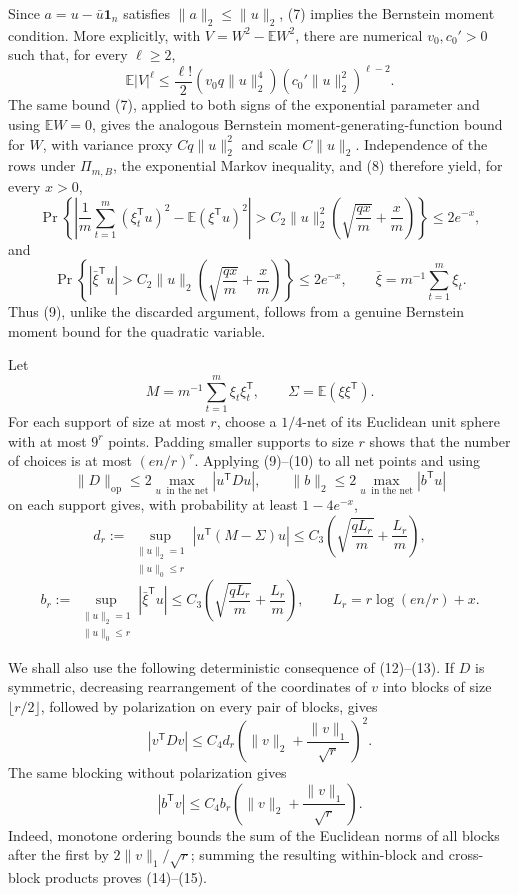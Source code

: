 Since \(a=u-\bar u\mathbf 1_n\) satisfies \(\lVert a\rVert_2\le\lVert u\rVert_2\), (7) implies the Bernstein moment condition.  More explicitly, with \(V=W^2-\mathbb EW^2\), there are numerical \(v_0,c_0'>0\) such that, for every \(\ell\ge2\),
\[
 \mathbb E|V|^\ell
 \le \frac{\ell!}{2}(v_0q\lVert u\rVert_2^4)
       (c_0'\lVert u\rVert_2^2)^{\ell-2}.
 \tag{8}
\]
The same bound (7), applied to both signs of the exponential parameter and using \(\mathbb EW=0\), gives the analogous Bernstein moment-generating-function bound for \(W\), with variance proxy \(Cq\lVert u\rVert_2^2\) and scale \(C\lVert u\rVert_2\).  Independence of the rows under \(\Pi_{m,B}\), the exponential Markov inequality, and (8) therefore yield, for every \(x>0\),
\[
 \Pr\!\left\{
  \left|\frac1m\sum_{t=1}^m(\xi_t^{\mathsf T}u)^2
        -\mathbb E(\xi^{\mathsf T}u)^2\right|
  >C_2\lVert u\rVert_2^2
       \left(\sqrt{\frac{qx}{m}}+\frac{x}{m}\right)
 \right\}\le2e^{-x},
 \tag{9}
\]
and
\[
 \Pr\!\left\{
  |\bar\xi^{\mathsf T}u|>
  C_2\lVert u\rVert_2
       \left(\sqrt{\frac{qx}{m}}+\frac{x}{m}\right)
 \right\}\le2e^{-x},
 \qquad \bar\xi=m^{-1}\sum_{t=1}^m\xi_t.
 \tag{10}
\]
Thus (9), unlike the discarded argument, follows from a genuine Bernstein moment bound for the quadratic variable.

Let
\[
 M=m^{-1}\sum_{t=1}^m\xi_t\xi_t^{\mathsf T},
 \qquad \Sigma=\mathbb E(\xi\xi^{\mathsf T}).
\]
For each support of size at most \(r\), choose a \(1/4\)-net of its Euclidean unit sphere with at most \(9^r\) points.  Padding smaller supports to size \(r\) shows that the number of choices is at most \((en/r)^r\).  Applying (9)--(10) to all net points and using
\[
 \lVert D\rVert_{\mathrm{op}}
 \le2\max_{u\ \text{ in the net}}|u^{\mathsf T}Du|,
 \qquad
 \lVert b\rVert_2
 \le2\max_{u\ \text{ in the net}}|b^{\mathsf T}u|
 \tag{11}
\]
on each support gives, with probability at least \(1-4e^{-x}\),
\[
 d_r:=\sup_{\substack{\lVert u\rVert_2=1\\\lVert u\rVert_0\le r}}
 |u^{\mathsf T}(M-\Sigma)u|
 \le C_3\left(\sqrt{\frac{qL_r}{m}}+\frac{L_r}{m}\right),
 \tag{12}
\]
\[
 b_r:=\sup_{\substack{\lVert u\rVert_2=1\\\lVert u\rVert_0\le r}}
 |\bar\xi^{\mathsf T}u|
 \le C_3\left(\sqrt{\frac{qL_r}{m}}+\frac{L_r}{m}\right),
 \qquad L_r=r\log(en/r)+x.
 \tag{13}
\]

We shall also use the following deterministic consequence of (12)--(13).  If \(D\) is symmetric, decreasing rearrangement of the coordinates of \(v\) into blocks of size \(\lfloor r/2\rfloor\), followed by polarization on every pair of blocks, gives
\[
 |v^{\mathsf T}Dv|
 \le C_4d_r\left(\lVert v\rVert_2+\frac{\lVert v\rVert_1}{\sqrt r}\right)^2.
 \tag{14}
\]
The same blocking without polarization gives
\[
 |b^{\mathsf T}v|
 \le C_4b_r\left(\lVert v\rVert_2+\frac{\lVert v\rVert_1}{\sqrt r}\right).
 \tag{15}
\]
Indeed, monotone ordering bounds the sum of the Euclidean norms of all blocks after the first by \(2\lVert v\rVert_1/\sqrt r\); summing the resulting within-block and cross-block products proves (14)--(15).

